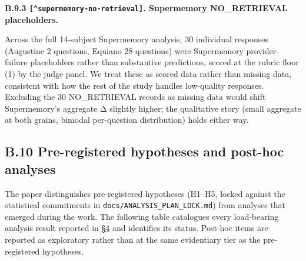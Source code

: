 \textbf{B.9.3 \texttt{{[}\^{}supermemory-no-retrieval{]}}. Supermemory
NO\_RETRIEVAL placeholders.}

Across the full 14-subject Supermemory analysis, 30 individual responses
(Augustine 2 questions, Equiano 28 questions) were Supermemory
provider-failure placeholders rather than substantive predictions,
scored at the rubric floor (1) by the judge panel. We treat these as
scored data rather than missing data, consistent with how the rest of
the study handles low-quality responses. Excluding the 30 NO\_RETRIEVAL
records as missing data would shift Supermemory's aggregate Δ slightly
higher; the qualitative story (small aggregate at both grains, bimodal
per-question distribution) holds either way.

\hypertarget{b.10-pre-registered-hypotheses-and-post-hoc-analyses}{%
\subsection{B.10 Pre-registered hypotheses and post-hoc
analyses}\label{b.10-pre-registered-hypotheses-and-post-hoc-analyses}}

The paper distinguishes pre-registered hypotheses (H1--H5, locked
against the statistical commitments in
\texttt{docs/ANALYSIS\_PLAN\_LOCK.md}) from analyses that emerged during
the work. The following table catalogues every load-bearing analysis
result reported in \hyperref[results]{§4} and identifies its status. Post-hoc items are
reported as exploratory rather than at the same evidentiary tier as the
pre-registered hypotheses.

